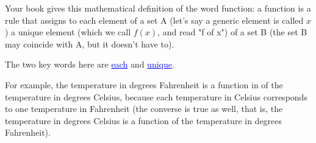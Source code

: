 \documentclass[11pt,dvipsnames]{article}
\begin{document}
Your book gives this mathematical definition of the word function: a function is a rule that assigns to each element of a set A (let's say a generic element is called $x$) a unique element (which we call $f(x)$, and read "f of x") of a set B (the set B may coincide with A, but it doesn't have to).

The two key words here are {\textcolor{blue}{\underline{each} }} and {\textcolor{blue}{\underline{unique}}}.

For example, the temperature in degrees Fahrenheit is a function in of the temperature in degrees Celsius, because each temperature in 
Celsius corresponds to one temperature in Fahrenheit (the converse is true as well, that is, the temperature in degrees Celsius is a 
function of the temperature in degrees Fahrenheit).
\end{document}
